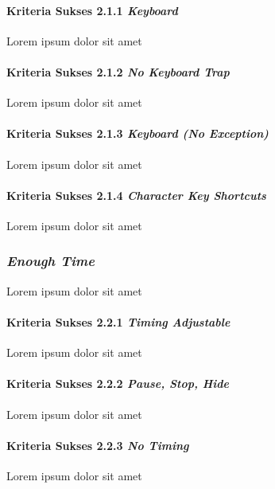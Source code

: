 \paragraph{Kriteria Sukses 2.1.1 \textit{Keyboard}}
\label{sec:kriteria_sukses_2.1.1}
Lorem ipsum dolor sit amet

\paragraph{Kriteria Sukses 2.1.2 \textit{No Keyboard Trap}}
\label{sec:kriteria_sukses_2.1.2}
Lorem ipsum dolor sit amet

\paragraph{Kriteria Sukses 2.1.3 \textit{Keyboard (No Exception)}}
\label{sec:kriteria_sukses_2.1.3}
Lorem ipsum dolor sit amet

\paragraph{Kriteria Sukses 2.1.4 \textit{Character Key Shortcuts}}
\label{sec:kriteria_sukses_2.1.4}
Lorem ipsum dolor sit amet

\subsubsection{\textit{Enough Time}}
\label{sec:enough_time}
Lorem ipsum dolor sit amet

\paragraph{Kriteria Sukses 2.2.1 \textit{Timing Adjustable}}
\label{sec:kriteria_sukses_2.2.1}
Lorem ipsum dolor sit amet

\paragraph{Kriteria Sukses 2.2.2 \textit{Pause, Stop, Hide}}
\label{sec:kriteria_sukses_2.2.2}
Lorem ipsum dolor sit amet

\paragraph{Kriteria Sukses 2.2.3 \textit{No Timing}}
\label{sec:kriteria_sukses_2.2.3}
Lorem ipsum dolor sit amet

